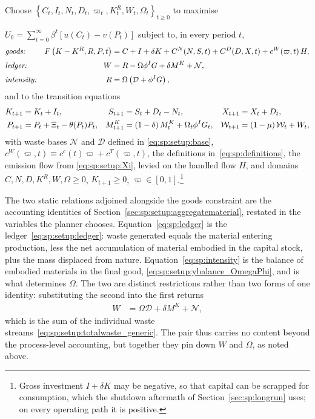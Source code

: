 \begin{problem}\label{prob:sp}
Choose $\left\{C_t,I_t,N_t,D_t,\varpi_t,K^R_t,W_t,\Omega_t\right\}_{t\ge0}$ to maximise

\noindent $U_0=\sum_{t=0}^\infty\beta^t\left[u(C_t)-v(P_t)\right]$ subject to, in every period $t$,
\begin{align}
&\text{\emph{goods:}}
&
F\left(K-K^R,R,P,t\right) &= C+I+\delta K+C^N(N,S,t)+C^D(D,X,t)+c^W\!\left(\varpi,t\right)H,
\label{eq:sp:goods}
\\[0.2em]
&\text{\emph{ledger:}}
&
W &= R-\Omega\phi^I G+\delta M^K+\mathcal N,
\label{eq:sp:ledger}
\\[0.2em]
&\text{\emph{intensity:}}
&
R &= \Omega\left(\mathcal D+\phi^IG\right),
\label{eq:sp:intensity}
\end{align}
and to the transition equations
\begin{align}
K_{t+1} &= K_t+I_t,
&
S_{t+1} &= S_t+D_t-N_t,
&
X_{t+1} &= X_t+D_t,
\notag\\
P_{t+1} &= P_t+\Xi_t-\theta(P_t)P_t,
&
M^K_{t+1} &= \left(1-\delta\right)M^K_t+\Omega_t\phi^I G_t,
&
\mathcal W_{t+1} &= \left(1-\mu\right)\mathcal W_t+W_t,
\label{eq:sp:states-motion}
\end{align}
with waste bases $\mathcal{N}$ and $\mathcal{D}$ defined in \eqref{eq:sp:setup:base}, $c^W\!\left(\varpi,t\right) \equiv c^c(t)\varpi+ c^T(\varpi,t)$, the definitions in~\eqref{eq:sp:definitions}, the emission flow from \eqref{eq:sp:setup:Xi}, levied on the handled flow $H$, and domains $C,N,D,K^R,W,\Omega\ge0$, $K_{t+1}\ge0$, $\varpi\in\left[0,1\right]$.\footnote{Gross investment $I+\delta K$ may be negative, so that capital can be scrapped for consumption, which the shutdown aftermath of Section~\ref{sec:sp:longrun} uses; on every operating path it is positive.}
\end{problem}

The two static relations adjoined alongside the goods constraint are the accounting identities of Section~\ref{sec:sp:setup:aggregatematerial}, restated in the variables the planner chooses. Equation~\eqref{eq:sp:ledger} is the ledger~\eqref{eq:sp:setup:ledger}: waste generated equals the material entering production, less the net accumulation of material embodied in the capital stock, plus the mass displaced from nature. Equation~\eqref{eq:sp:intensity} is the balance of embodied materials in the final good, \eqref{eq:sp:setup:ybalance_OmegaPhi}, and is what determines $\Omega$. The two are distinct restrictions rather than two forms of one identity: substituting the second into the first returns
\begin{align}
W &= \Omega\mathcal D+\delta M^K+\mathcal N,
\label{eq:sp:ledger-streams}
\end{align}
which is the sum of the individual waste streams~\eqref{eq:sp:setup:totalwaste_generic}. The pair thus carries no content beyond the process-level accounting, but together they pin down $W$ and $\Omega$, as noted above.

